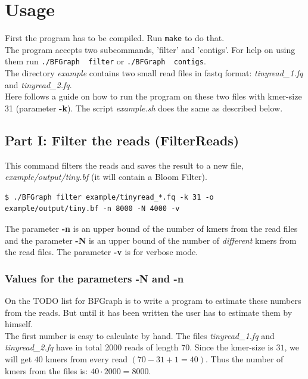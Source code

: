 \documentclass[a4paper]{report}
\renewcommand{\b}[1]{\textbf{#1}}  %
\newcommand{\e}[1]{\emph{#1}}    %
\begin{document}
\chapter{Usage}
First the program has to be compiled. Run {\verb `make` } to do that.\\[4pt]

The program accepts two subcommands, 'filter' and 'contigs'. 
For help on using them run {\verb `./BFGraph  filter`} or {\verb `./BFGraph  contigs`}.\\[4pt] 

The directory \e{example} contains two small  read files in fastq format: 
\e{tinyread\_1.fq} and \e{tinyread\_2.fq}.\\[4pt]

Here follows a guide on how to run the program on these two files with kmer-size 31 (parameter \b{-k}).
The script \e{example.sh} does the same as described below.

\section{Part I: Filter the reads (FilterReads)}
This command filters the reads and saves the result to a new file, \e{example/output/tiny.bf} (it will contain a Bloom Filter).
\begin{verbatim}
$ ./BFGraph filter example/tinyread_*.fq -k 31 -o example/output/tiny.bf -n 8000 -N 4000 -v
\end{verbatim}

The parameter \b{-n} is an upper bound of the number of kmers from the read files and the parameter \b{-N} is an upper bound
of the number of \textit{different} kmers from the read files. The parameter \b{-v} is for verbose mode.\\[4pt]

\subsection{Values for the parameters \b{-N} and \b{-n}}  %
On the TODO list for BFGraph is to write a program to estimate these numbers from the reads. But until it has been written the user has to estimate
them by himself. \\[4pt]

The first number is easy to calculate by hand. The files \e{tinyread\_1.fq} and \e{tinyread\_2.fq} have in total 2000 reads of length $70$.
Since the kmer-size is $31$, we will get $40$ kmers from every read $(70 - 31 + 1=40)$. Thus the number of kmers from the files
is: $40\cdot 2000=8000$. \\[4pt]
\end{document}
